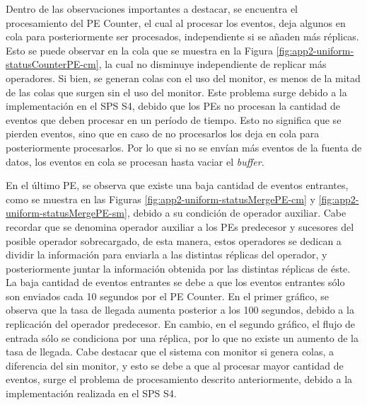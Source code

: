 
Dentro de las observaciones importantes a destacar, se encuentra el procesamiento del PE Counter, el cual al procesar los eventos, deja algunos en cola para posteriormente ser procesados, independiente si se añaden más réplicas. Esto se puede observar en la cola que se muestra en la Figura \ref{fig:app2-uniform-statusCounterPE-cm}, la cual no disminuye independiente de replicar más operadores. Si bien, se generan colas con el uso del monitor, es menos de la mitad de las colas que surgen sin el uso del monitor. Este problema surge debido a la implementación en el SPS S4, debido que los PEs no procesan la cantidad de eventos que deben procesar en un período de tiempo. Esto no significa que se pierden eventos, sino que en caso de no procesarlos los deja en cola para posteriormente procesarlos. Por lo que si no se envían más eventos de la fuenta de datos, los eventos en cola se procesan hasta vaciar el \textit{buffer}.

En el último PE, se observa que existe una baja cantidad de eventos entrantes, como se muestra en las Figuras \ref{fig:app2-uniform-statusMergePE-cm} y \ref{fig:app2-uniform-statusMergePE-sm}, debido a su condición de operador auxiliar. Cabe recordar que se denomina operador auxiliar a los PEs predecesor y sucesores del posible operador sobrecargado, de esta manera, estos operadores se dedican a dividir la información para enviarla a las distintas réplicas del operador, y posteriormente juntar la información obtenida por las distintas réplicas de éste. La baja cantidad de eventos entrantes se debe a que los eventos entrantes sólo son enviados cada 10 segundos por el PE Counter. En el primer gráfico, se observa que la tasa de llegada aumenta posterior a los 100 segundos, debido a la replicación del operador predecesor. En cambio, en el segundo gráfico, el flujo de entrada sólo se condiciona por una réplica, por lo que no existe un aumento de la tasa de llegada. Cabe destacar que el sistema con monitor si genera colas, a diferencia del sin monitor, y esto se debe a que al procesar mayor cantidad de eventos, surge el problema de procesamiento descrito anteriormente, debido a la implementación realizada en el SPS S4.

